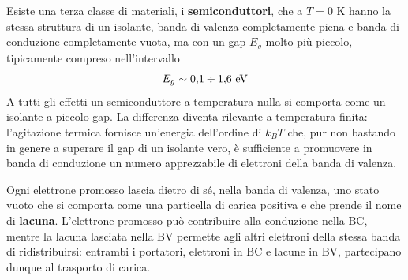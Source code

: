 Esiste una terza classe di materiali, i \textbf{semiconduttori}, che a \( T = 0 \) K hanno la stessa struttura di un isolante, banda di valenza completamente piena e banda di conduzione completamente vuota, ma con un gap \( E_g \) molto più piccolo, tipicamente compreso nell'intervallo
\begin{equation}
    E_g \sim 0{,}1 \divisionsymbol 1{,}6 \ \text{eV}
\end{equation}
A tutti gli effetti un semiconduttore a temperatura nulla si comporta come un isolante a piccolo gap. La differenza diventa rilevante a temperatura finita: l'agitazione termica fornisce un'energia dell'ordine di \( k_B T \) che, pur non bastando in genere a superare il gap di un isolante vero, è sufficiente a promuovere in banda di conduzione un numero apprezzabile di elettroni della banda di valenza.

Ogni elettrone promosso lascia dietro di sé, nella banda di valenza, uno stato vuoto che si comporta come una particella di carica positiva e che prende il nome di \textbf{lacuna}. L'elettrone promosso può contribuire alla conduzione nella BC, mentre la lacuna lasciata nella BV permette agli altri elettroni della stessa banda di ridistribuirsi: entrambi i portatori, elettroni in BC e lacune in BV, partecipano dunque al trasporto di carica.

